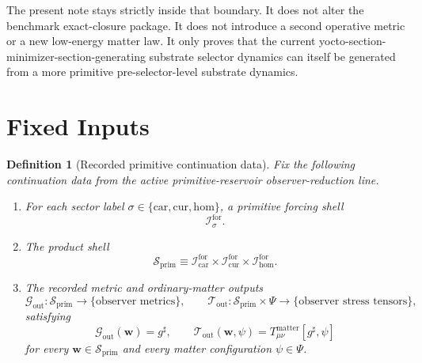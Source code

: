 \documentclass[11pt]{article}
\newcommand{\CompletedMetric}{g^{\sharp}}
\newcommand{\MatterSpace}{\Psi}
\newcommand{\Car}{\mathrm{car}}
\newcommand{\Cur}{\mathrm{cur}}
\newcommand{\Hom}{\mathrm{hom}}
\newcommand{\ForSpace}[1]{\mathcal I_{#1}^{\mathrm{for}}}
\newcommand{\PrimShell}{\mathcal S_{\mathrm{prim}}}
\newcommand{\MetricOut}{\mathscr G_{\mathrm{out}}}
\newcommand{\MatterOut}{\mathscr T_{\mathrm{out}}}
\newtheorem{definition}{Definition}
\begin{document}
The present note stays strictly inside that boundary. It does not alter the benchmark exact-closure package. It does not introduce a second operative metric or a new low-energy matter law. It only proves that the current yocto-section-minimizer-section-generating substrate selector dynamics can itself be generated from a more primitive pre-selector-level substrate dynamics.

\section{Fixed Inputs}

\begin{definition}[Recorded primitive continuation data]
\label{def:fixed}
Fix the following continuation data from the active primitive-reservoir observer-reduction line.
\begin{enumerate}
    \item For each sector label \(\sigma\in\{\Car,\Cur,\Hom\}\), a primitive forcing shell
    \[
    \ForSpace{\sigma}.
    \]
    \item The product shell
    \[
    \PrimShell
    \equiv
    \ForSpace{\Car}\times \ForSpace{\Cur}\times \ForSpace{\Hom}.
    \]
    \item The recorded metric and ordinary-matter outputs
    \[
    \MetricOut:\PrimShell\to\{\text{observer metrics}\},
    \qquad
    \MatterOut:\PrimShell\times\MatterSpace\to\{\text{observer stress tensors}\},
    \]
    satisfying
    \begin{equation}
    \MetricOut(\mathbf w)=\CompletedMetric,
    \qquad
    \MatterOut(\mathbf w,\psi)
    =
    T_{\mu\nu}^{\mathrm{matter}}[\CompletedMetric,\psi]
    \label{eq:fixedoutputs}
    \end{equation}
    for every \(\mathbf w\in\PrimShell\) and every matter configuration \(\psi\in\MatterSpace\).
\end{enumerate}
\end{definition}
\end{document}
